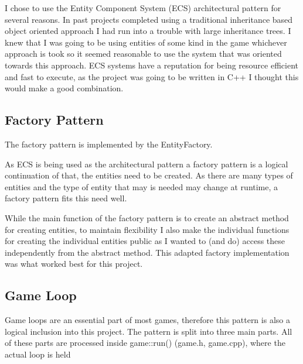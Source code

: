 \documentclass{article}
\begin{document}
I chose to use the Entity Component System (ECS) architectural pattern for several reasons.
In past projects completed using a traditional inheritance based object oriented approach I had run into a trouble with large inheritance trees. 
I knew that I was going to be using entities of some kind in the game whichever approach is took so it seemed reasonable to use the system that was oriented towards this approach.
ECS systems have a reputation for being resource efficient and fast to execute, as the project was going to be written in C++ I thought this would make a good combination.


\subsection{Factory Pattern}

The factory pattern is implemented by the EntityFactory. 

As ECS is being used as the architectural pattern a factory pattern is a logical continuation of that, the entities need to be created.
As there are many types of entities and the type of entity that may is needed may change at runtime, a factory pattern fits this need well.

While the main function of the factory pattern is to create an abstract method for creating entities,
to maintain flexibility I also make the individual functions for creating the individual entities public as I wanted to (and do) access these independently from the abstract method.
This adapted factory implementation was what worked best for this project.

\subsection{Game Loop}

Game loops are an essential part of most games, therefore this pattern is also a logical inclusion into this project. 
The pattern is split into three main parts. All of these parts are processed inside game::run() (game.h, game.cpp), where the actual loop is held
\end{document}
